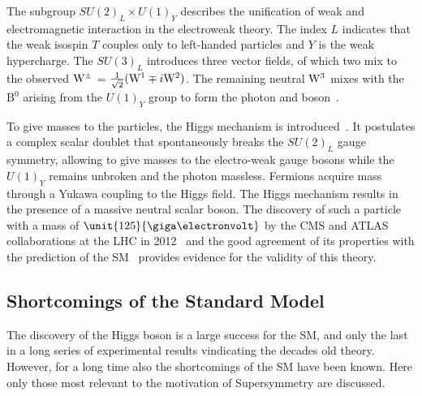 The subgroup $SU(2)_L \times U(1)_Y$ describes the unification of weak and electromagnetic interaction in the electroweak theory. The index $L$ indicates that the weak isospin $T$ couples only to left-handed particles and $Y$ is the weak hypercharge. The $SU(3)_L$ introduces three vector fields, of which two mix to the observed $\mathrm{W}^{\pm}$ = $\frac{1}{\sqrt{2}}(\mathrm{W}^1\mp i\mathrm{W}^2)$. The remaining neutral $\mathrm{W}^3$ mixes with the $\mathrm{B}^0$ arising from the $U(1)_Y$ group to form the photon and \Z boson~\cite{HalzenMartin}.

To give masses to the particles, the Higgs mechanism is introduced~\cite{PhysRevLett.13.508,PhysRevLett.13.321,PhysRevLett.13.585}. It postulates a complex scalar doublet that spontaneously breaks the $SU(2)_L$ gauge symmetry, allowing to give masses to the electro-weak gauge bosons while the $U(1)_Y$ remains unbroken and the photon massless. Fermions acquire mass through a Yukawa coupling to the Higgs field. The Higgs mechanism results in the presence of a massive neutral scalar boson. The discovery of such a particle with a mass of $\unit{125}{\giga\electronvolt}$ by the CMS and ATLAS collaborations at the LHC in 2012~\cite{Chatrchyan:2012ufa,Aad:2012tfa} and the good agreement of its properties with the prediction of the SM~\cite{Khachatryan:2014jba} provides evidence for the validity of this theory.   

\subsection*{Shortcomings of the Standard Model}
The discovery of the Higgs boson is a large success for the SM, and only the last in a long series of experimental results vindicating the decades old theory. However, for a long time also the shortcomings of the SM have been known. Here only those most relevant to the motivation of Supersymmetry are discussed.

